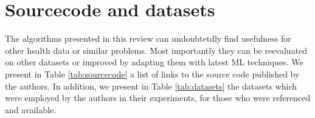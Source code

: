 \section{Sourcecode and datasets}
The algorithms presented in this review can undoubtetdly find usefulness for other health data or similar problems. Most importantly they can be reevaluated on other datasets or improved by adapting them with latest ML techniques. We present in Table \ref{tab:sourcecode} a list of links to the source code published by the authors. In addition, we present in Table \ref{tab:datasets} the datasets which were employed by the authors in their experiments, for those who were referenced and available. 



